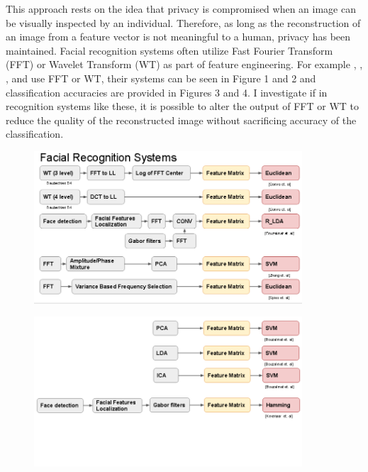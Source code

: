 \documentclass[12pt, letterpaper]{article}
\begin{document}
This approach rests on the idea that privacy is compromised when an image can be visually inspected by an individual. Therefore, as long as the reconstruction of an image from a feature vector is not meaningful to a human, privacy has been maintained. Facial recognition systems often utilize Fast Fourier Transform (FFT) or Wavelet Transform (WT) as part of feature engineering. For example \cite{spies2000face}, \cite{bouzalmat2011facial}, 
\cite{dehai2013pca}, and \cite{samra2003face} use FFT or WT, their systems can be seen in Figure 1 and 2 and classification accuracies are provided in Figures 3 and 4. I investigate if in recognition systems like these, it is possible to alter the output of FFT or WT to reduce the quality of the reconstructed image without sacrificing accuracy of the classification.           

\begin{center}
	\begin{figure}[!htbp]
		\centering
		\includegraphics[width=10cm, keepaspectratio]{systems}
		\label{fig:systems}
	\end{figure}
\end{center}

\begin{center}
	\begin{figure}[!htbp]
		\centering
		\includegraphics[width=10cm, keepaspectratio]{systems1}
		\label{fig:systems}
	\end{figure}
\end{center}
\end{document}
